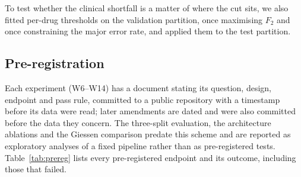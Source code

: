 To test whether the clinical shortfall is a matter of where the cut sits, we also fitted per-drug
thresholds on the validation partition, once maximising $F_2$ and once constraining the major error
rate, and applied them to the test partition.

\subsection*{Pre-registration}
Each experiment (W6--W14) has a document stating its question, design, endpoint and pass rule,
committed to a public repository with a timestamp before its data were read; later amendments are
dated and were also committed before the data they concern. The three-split evaluation, the
architecture ablations and the Giessen comparison predate this scheme and are reported as
exploratory analyses of a fixed pipeline rather than as pre-registered tests.
Table~\ref{tab:prereg} lists every pre-registered endpoint and its outcome, including those that
failed.

